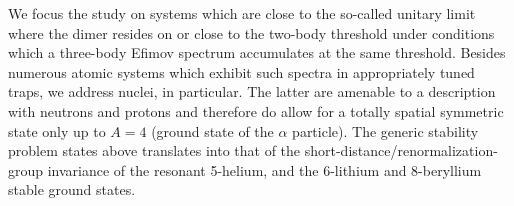 \documentclass[preprint,12pt]{elsarticle}
\begin{document}
We focus the study on systems which are close to the so-called unitary limit where the dimer resides on or close to
the two-body threshold under conditions which a three-body Efimov spectrum accumulates at the same threshold.
Besides numerous atomic systems which exhibit such spectra in appropriately tuned traps,
we address nuclei, in particular. The latter are amenable to a description with neutrons and protons and
therefore do allow for a totally spatial symmetric state only up to $A=4$ (ground state of the $\alpha$ particle).
The generic stability problem states above translates into that of the short-distance/renormalization-group
invariance of the resonant 5-helium, and the 6-lithium and 8-beryllium stable ground states. 

\end{document}

